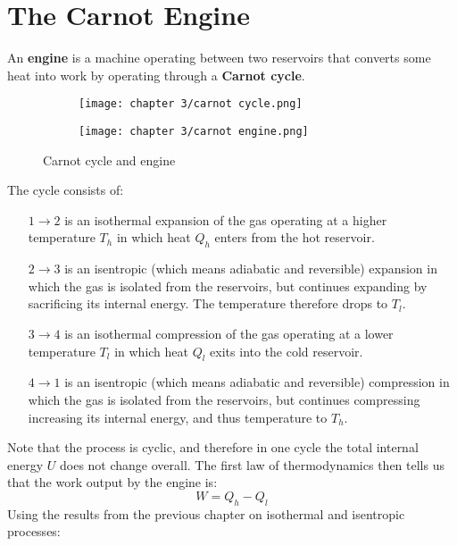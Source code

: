 \documentclass[a4paper,11pt,oneside]{book}
\begin{document}
\section{The Carnot Engine}
An \textbf{engine} is a machine operating between two reservoirs that converts some heat into work by operating through a \textbf{Carnot cycle}. 
\begin{figure}[h!]
\centering
\begin{subfigure}{0.4\textwidth}
  \centering
  \texttt{[image: chapter 3/carnot cycle.png]}
  \label{fig:sub1}
\end{subfigure}%
\begin{subfigure}{0.4\textwidth}
  \centering
  \texttt{[image: chapter 3/carnot engine.png]}
  \label{fig:sub2}
\end{subfigure}
\caption{Carnot cycle and engine}
\label{fig:test}
\end{figure}
The cycle consists of:
\begin{enumerate}
    \item[$1\rightarrow 2$] is an isothermal expansion of the gas operating at a higher temperature $T_h$ in which heat $Q_h$ enters from the hot reservoir. 
    \item[$2\rightarrow 3$] is an isentropic (which means adiabatic and reversible) expansion in which the gas is isolated from the reservoirs, but continues expanding by sacrificing its internal energy. The temperature therefore drops to $T_l$.
    \item[$3\rightarrow 4$] is an isothermal compression of the gas operating at a lower temperature $T_l$ in which heat $Q_l$ exits into the cold reservoir.
     \item[$4\rightarrow 1$] is an isentropic (which means adiabatic and reversible) compression in which the gas is isolated from the reservoirs, but continues compressing increasing its internal energy, and thus temperature to $T_h$. 
\end{enumerate}

Note that the process is cyclic, and therefore in one cycle the total internal energy $U$ does not change overall. The first law of thermodynamics then tells us that the work output by the engine is:
\begin{equation}
W= Q_h-Q_l
\end{equation}
Using the results from the previous chapter on isothermal and isentropic processes:
\end{document}
